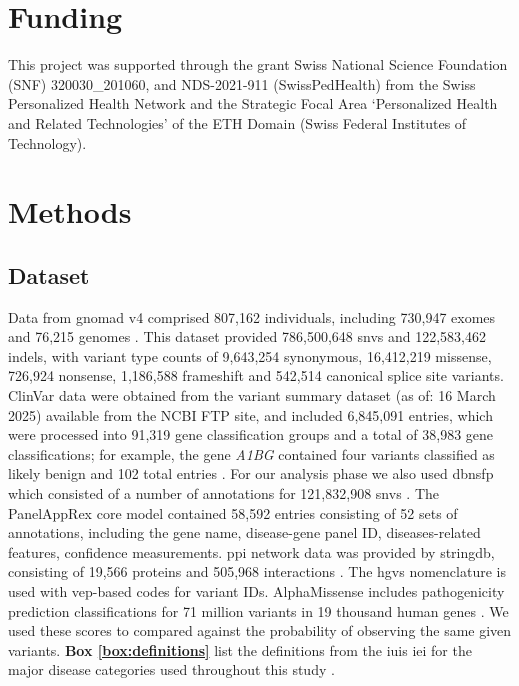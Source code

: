 \section*{Funding}
\noindent This project was supported through the grant Swiss National Science Foundation (SNF) 320030\_201060, and NDS-2021-911 (SwissPedHealth) from the Swiss Personalized Health Network and the Strategic Focal Area `Personalized Health and Related Technologies' of the ETH Domain (Swiss Federal Institutes of Technology).

\clearpage

\section{Methods}
\subsection{Dataset}

Data from \ac{gnomad} v4 comprised 807,162 individuals, including 730,947 exomes and 76,215 genomes \cite{karczewski2020mutational}. This dataset provided 786,500,648 \ac{snv}s and 122,583,462 \ac{indel}s, with variant type counts of 9,643,254 synonymous, 16,412,219 missense, 726,924 nonsense, 1,186,588 frameshift and 542,514 canonical splice site variants. ClinVar data were obtained from the variant summary dataset (as of: 16 March 2025) available from the NCBI FTP site, and included 6,845,091 entries, which were processed into 91,319 gene classification groups and a total of 38,983 gene classifications; for example, the gene \textit{A1BG} contained four variants classified as likely benign and 102 total entries \cite{landrum_clinvar_2018}. For our analysis phase we also used \ac{dbnsfp} which consisted of a number of annotations for 121,832,908 \ac{snv}s 
\cite{liu_dbnsfp_2020}. 
The PanelAppRex core model contained 58,592 entries consisting of 52 sets of annotations, including the gene name, disease-gene panel ID, diseases-related features, confidence measurements.
\cite{lawless_panelapprex_2025}
\ac{ppi} network data was provided by \ac{stringdb}, consisting of 19,566 proteins and 505,968 interactions \cite{szklarczyk2025string}.
The \ac{hgvs} nomenclature is used with \ac{vep}-based codes for variant IDs.
AlphaMissense includes pathogenicity prediction classifications for 71 million variants in 19 thousand human genes \cite{cheng_accurate_2023, jun_cheng_2023_8208688}. We used these scores to compared against the probability of observing the same given variants.
\textbf{Box \ref{box:definitions}} list the definitions from the \ac{iuis} \ac{iei} for the major disease categories used throughout this study \cite{poli_human_2025}.

